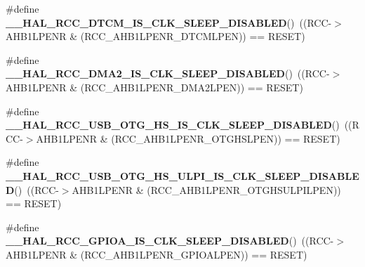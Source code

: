 \begin{DoxyCompactItemize}
\item 
\mbox{\label{group___r_c_c___clock___sleep___enable___disable___status_ga96f30a32ec59f6043743e8cf692ec0e9}} 
\#define {\bfseries \+\_\+\+\_\+\+H\+A\+L\+\_\+\+R\+C\+C\+\_\+\+D\+T\+C\+M\+\_\+\+I\+S\+\_\+\+C\+L\+K\+\_\+\+S\+L\+E\+E\+P\+\_\+\+D\+I\+S\+A\+B\+L\+ED}()~((R\+CC-\/$>$A\+H\+B1\+L\+P\+E\+NR \& (R\+C\+C\+\_\+\+A\+H\+B1\+L\+P\+E\+N\+R\+\_\+\+D\+T\+C\+M\+L\+P\+EN)) == R\+E\+S\+ET)
\item 
\mbox{\label{group___r_c_c___clock___sleep___enable___disable___status_gaef7e3ef7b34fec8e351c0d35a0c0b914}} 
\#define {\bfseries \+\_\+\+\_\+\+H\+A\+L\+\_\+\+R\+C\+C\+\_\+\+D\+M\+A2\+\_\+\+I\+S\+\_\+\+C\+L\+K\+\_\+\+S\+L\+E\+E\+P\+\_\+\+D\+I\+S\+A\+B\+L\+ED}()~((R\+CC-\/$>$A\+H\+B1\+L\+P\+E\+NR \& (R\+C\+C\+\_\+\+A\+H\+B1\+L\+P\+E\+N\+R\+\_\+\+D\+M\+A2\+L\+P\+EN)) == R\+E\+S\+ET)
\item 
\mbox{\label{group___r_c_c___clock___sleep___enable___disable___status_gafbf2bdc7f1694ec4d193c0a3d729dd3c}} 
\#define {\bfseries \+\_\+\+\_\+\+H\+A\+L\+\_\+\+R\+C\+C\+\_\+\+U\+S\+B\+\_\+\+O\+T\+G\+\_\+\+H\+S\+\_\+\+I\+S\+\_\+\+C\+L\+K\+\_\+\+S\+L\+E\+E\+P\+\_\+\+D\+I\+S\+A\+B\+L\+ED}()~((R\+CC-\/$>$A\+H\+B1\+L\+P\+E\+NR \& (R\+C\+C\+\_\+\+A\+H\+B1\+L\+P\+E\+N\+R\+\_\+\+O\+T\+G\+H\+S\+L\+P\+EN)) == R\+E\+S\+ET)
\item 
\mbox{\label{group___r_c_c___clock___sleep___enable___disable___status_ga5a248f5fa1b10b3bae1f840395d52812}} 
\#define {\bfseries \+\_\+\+\_\+\+H\+A\+L\+\_\+\+R\+C\+C\+\_\+\+U\+S\+B\+\_\+\+O\+T\+G\+\_\+\+H\+S\+\_\+\+U\+L\+P\+I\+\_\+\+I\+S\+\_\+\+C\+L\+K\+\_\+\+S\+L\+E\+E\+P\+\_\+\+D\+I\+S\+A\+B\+L\+ED}()~((R\+CC-\/$>$A\+H\+B1\+L\+P\+E\+NR \& (R\+C\+C\+\_\+\+A\+H\+B1\+L\+P\+E\+N\+R\+\_\+\+O\+T\+G\+H\+S\+U\+L\+P\+I\+L\+P\+EN)) == R\+E\+S\+ET)
\item 
\mbox{\label{group___r_c_c___clock___sleep___enable___disable___status_gafb90a4c788e0b1e1dee61e462ada7f17}} 
\#define {\bfseries \+\_\+\+\_\+\+H\+A\+L\+\_\+\+R\+C\+C\+\_\+\+G\+P\+I\+O\+A\+\_\+\+I\+S\+\_\+\+C\+L\+K\+\_\+\+S\+L\+E\+E\+P\+\_\+\+D\+I\+S\+A\+B\+L\+ED}()~((R\+CC-\/$>$A\+H\+B1\+L\+P\+E\+NR \& (R\+C\+C\+\_\+\+A\+H\+B1\+L\+P\+E\+N\+R\+\_\+\+G\+P\+I\+O\+A\+L\+P\+EN)) == R\+E\+S\+ET)

\end{DoxyCompactItemize}
